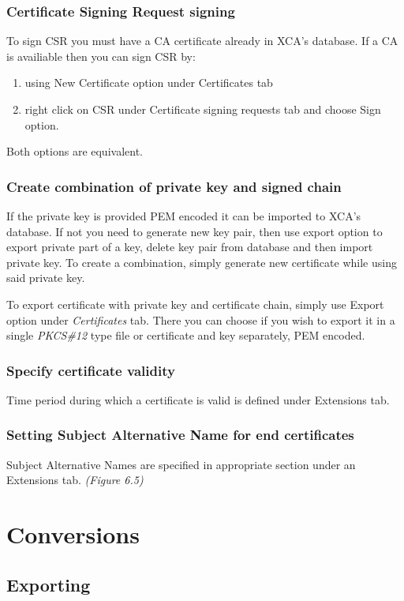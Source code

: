 \documentclass[10pt, a4paper]{report}
\begin{document}
    \subsubsection{Certificate Signing Request signing}
To sign CSR you must have a CA certificate already in XCA's database. If a CA is availiable then you can sign CSR by:

\begin{enumerate}
\item using New Certificate option under Certificates tab 
\item right click on CSR under Certificate signing requests tab and choose Sign option. 
\end{enumerate}
Both options are equivalent.    

    \subsubsection{Create combination of private key and signed chain}
If the private key is provided PEM encoded it can be imported to XCA's database. If not you need to generate new key pair, then use export option to export private part of a key, delete key pair from database and then import private key. To create a combination, simply generate new certificate while using said private key.

To export certificate with private key and certificate chain, simply use Export option under \textit{Certificates} tab. There you can choose if you wish to export it in a single \textit{PKCS\#12} type file or certificate and key separately, PEM encoded.

    \subsubsection{Specify certificate validity}
Time period during which a certificate is valid is defined under Extensions tab.
    \subsubsection{Setting Subject Alternative Name for end certificates}
Subject Alternative Names are specified in appropriate section under an Extensions tab.
\textit{(Figure 6.5)}

\section{Conversions}

  \subsection{Exporting}
  
\end{document}
